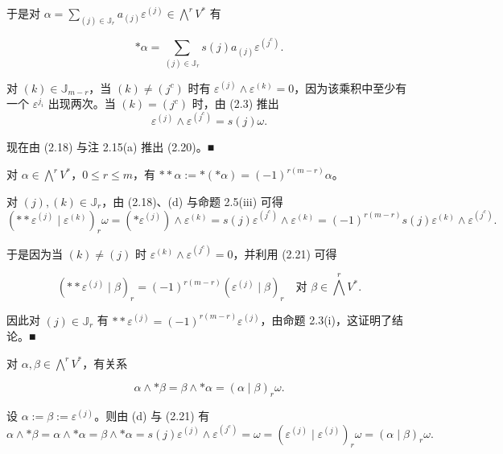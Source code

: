 \begin{example}
\begin{items}
于是对 $ \alpha = \sum_{(j)\in\mathbb{J}_r} a_{(j)}\varepsilon^{(j)} \in \bigwedge^{r}V^{*} $ 有

\[
\ast\alpha = \sum_{(j)\in\mathbb{J}_r} s(j)a_{(j)}\varepsilon^{(j^{c})}.
\]

\proofhead
对 $ (k) \in \mathbb{J}_{m-r} $，当 $ (k) \ne (j^{c}) $ 时有 $ \varepsilon^{(j)} \wedge \varepsilon^{(k)} = 0 $，因为该乘积中至少有一个 $ \varepsilon^{j_i} $ 出现两次。当 $ (k) = (j^{c}) $ 时，由 (2.3) 推出
\begin{equation}
\varepsilon^{(j)} \wedge \varepsilon^{(j^{c})} = s(j)\omega.\tag{2.21}
\end{equation}

现在由 (2.18) 与注 2.15(a) 推出 (2.20)。\nobreak\hspace{0.35em}■

\item

对 $ \alpha \in \bigwedge^{r}V^{*} $，$ 0 \le r \le m $，有 $ \ast\ast\alpha := \ast(\ast\alpha) = (-1)^{r(m-r)}\alpha $。

\proofhead
对 $ (j), (k) \in \mathbb{J}_r $，由 (2.18)、(d) 与命题 2.5(iii) 可得
\[
(\ast\ast\varepsilon^{(j)} \mid \varepsilon^{(k)})_r\omega = (\ast\varepsilon^{(j)}) \wedge \varepsilon^{(k)} = s(j)\varepsilon^{(j^{c})} \wedge \varepsilon^{(k)} = (-1)^{r(m-r)}s(j)\varepsilon^{(k)} \wedge \varepsilon^{(j^{c})}.
\]

于是因为当 $ (k) \ne (j) $ 时 $ \varepsilon^{(k)} \wedge \varepsilon^{(j^{c})} = 0 $，并利用 (2.21) 可得

\[
(\ast\ast\varepsilon^{(j)} \mid \beta)_r = (-1)^{r(m-r)}(\varepsilon^{(j)} \mid \beta)_r \quad \text{对 } \beta \in \bigwedge^{r}V^{*}.
\]

因此对 $ (j) \in \mathbb{J}_r $ 有 $ \ast\ast\varepsilon^{(j)} = (-1)^{r(m-r)}\varepsilon^{(j)} $，由命题 2.3(i)，这证明了结论。\nobreak\hspace{0.35em}■

\item

对 $ \alpha, \beta \in \bigwedge^{r}V^{*} $，有关系

\begin{equation}
\alpha \wedge \ast\beta = \beta \wedge \ast\alpha = (\alpha \mid \beta)_r\omega.\tag{2.22}
\end{equation}

\proofhead
设 $ \alpha := \beta := \varepsilon^{(j)} $。则由 (d) 与 (2.21) 有
\[
\alpha \wedge \ast\beta = \alpha \wedge \ast\alpha = \beta \wedge \ast\alpha = s(j)\varepsilon^{(j)} \wedge \varepsilon^{(j^{c})} = \omega = (\varepsilon^{(j)} \mid \varepsilon^{(j)})_r\omega = (\alpha \mid \beta)_r\omega.
\]


\end{items}
\end{example}
